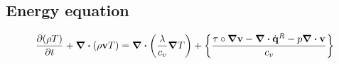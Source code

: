 
\subsection{Energy equation}

\begin{equation}
	\pdv{(\rho T)}{t} + \div(\rho \vb{v} T) = 
	\div(\frac{\lambda}{c_v} \grad{T}) + 
	\left\{ \frac{\vb{\tau} \circ \grad{\vb{v}} - \div{\dot{\vb{q}}^R} - p \div{\vb{v}}}{c_v}\right\}
\end{equation}


